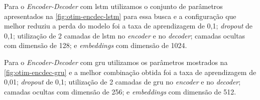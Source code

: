 Para o \textit{Encoder-Decoder} com \acrshort{lstm} utilizamos o conjunto de parâmetros apresentados na \autoref{fig:otim-encdec-lstm} para essa busca e a configuração que melhor reduziu a perda do modelo foi a taxa de aprendizagem de 0,1; \textit{dropout} de 0,1; utilização de 2 camadas de \acrshort{lstm} no \textit{encoder} e no \textit{decoder}; camadas ocultas com dimensão de 128; e \textit{embeddings} com dimensão de 1024.


Para o \textit{Encoder-Decoder} com \acrshort{gru} utilizamos os parâmetros mostrados na \autoref{fig:otim-encdec-gru} e a melhor combinação obtida foi a taxa de aprendizagem de 0,01; \textit{dropout} de 0,1; utilização de 2 camadas de \acrshort{gru} no \textit{encoder} e no \textit{decoder}; camadas ocultas com dimensão de 256; e \textit{embeddings} com dimensão de 512.

